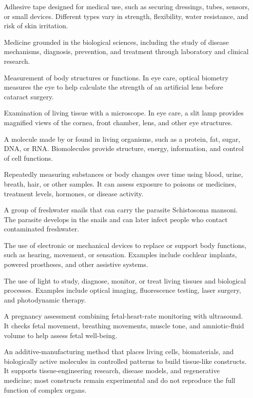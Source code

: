  Adhesive tape designed for medical use, such as securing dressings, tubes, sensors, or small devices. Different types vary in strength, flexibility, water resistance, and risk of skin irritation.

 Medicine grounded in the biological sciences, including the study of disease mechanisms, diagnosis, prevention, and treatment through laboratory and clinical research.

 Measurement of body structures or functions. In eye care, optical biometry measures the eye to help calculate the strength of an artificial lens before cataract surgery.

 Examination of living tissue with a microscope. In eye care, a slit lamp provides magnified views of the cornea, front chamber, lens, and other eye structures.

 A molecule made by or found in living organisms, such as a protein, fat, sugar, DNA, or RNA. Biomolecules provide structure, energy, information, and control of cell functions.

 Repeatedly measuring substances or body changes over time using blood, urine, breath, hair, or other samples. It can assess exposure to poisons or medicines, treatment levels, hormones, or disease activity.

 A group of freshwater snails that can carry the parasite Schistosoma mansoni. The parasite develops in the snails and can later infect people who contact contaminated freshwater.

 The use of electronic or mechanical devices to replace or support body functions, such as hearing, movement, or sensation. Examples include cochlear implants, powered prostheses, and other assistive systems.

 The use of light to study, diagnose, monitor, or treat living tissues and biological processes. Examples include optical imaging, fluorescence testing, laser surgery, and photodynamic therapy.

 A pregnancy assessment combining fetal-heart-rate monitoring with ultrasound. It checks fetal movement, breathing movements, muscle tone, and amniotic-fluid volume to help assess fetal well-being.

 An additive-manufacturing method that places living cells, biomaterials, and biologically active molecules in controlled patterns to build tissue-like constructs. It supports tissue-engineering research, disease models, and regenerative medicine; most constructs remain experimental and do not reproduce the full function of complex organs.

